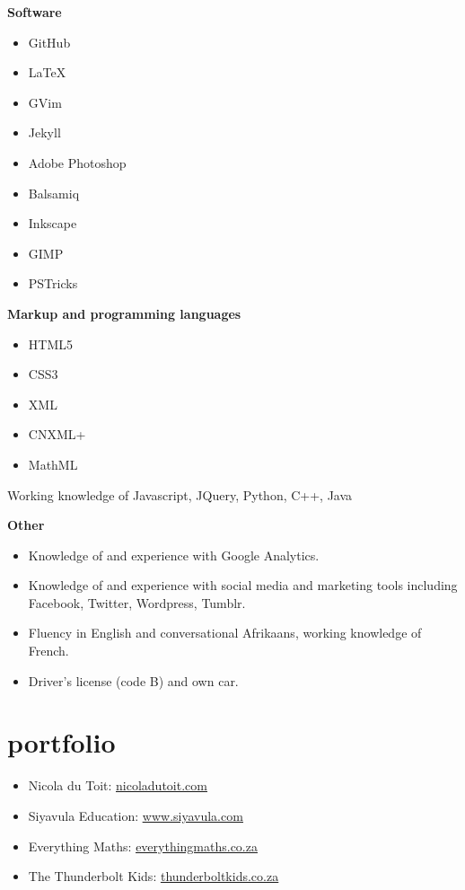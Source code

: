 \documentclass[]{friggeri-cv} %
\begin{document}
\textbf{Software}
\begin{multicols}{2}
\begin{itemize}
 \item GitHub
 \item LaTeX
 \item GVim
 \item Jekyll
  \item Adobe Photoshop
 \item Balsamiq
 \item Inkscape
 \item GIMP
 \item PSTricks
\end{itemize}
\end{multicols}

\textbf{Markup and programming languages}
\begin{itemize}
 \item HTML5
 \item CSS3
 \item XML
 \item CNXML+
 \item MathML
 \end{itemize}
Working knowledge of Javascript, JQuery, Python, C++, Java

\textbf{Other}
\begin{itemize}
 \item Knowledge of and experience with Google Analytics.
 \item Knowledge of and experience with social media and marketing tools including Facebook, Twitter, Wordpress, Tumblr.
 \item Fluency in English and conversational Afrikaans, working knowledge of French.
 \item Driver's license (code B) and own car.
\end{itemize}


\section{portfolio}
\begin{itemize}
 \item Nicola du Toit: \href{http://www.nicoladutoit.com/ux-portfolio}{\underline{nicoladutoit.com}}
 \item Siyavula Education: \href{http://www.siyavula.com}{\underline{www.siyavula.com}}
 \item Everything Maths: \href{http://www.everythingmaths.co.za}{\underline{everythingmaths.co.za}}
 \item The Thunderbolt Kids: \href{http://thunderboltkids.co.za}{\underline{thunderboltkids.co.za}}
\end{itemize}
\end{document}
